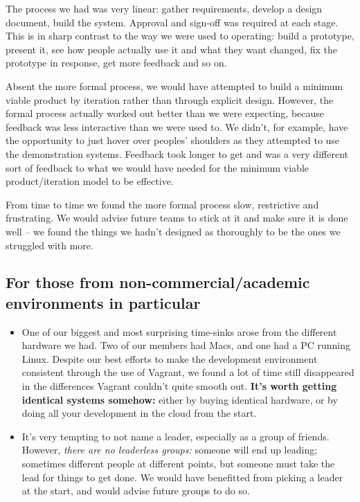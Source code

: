 \documentclass[12pt,a4paper,twosided]{article}
\begin{document}
The process we had was very linear: gather requirements, develop a
design document, build the system. Approval and sign-off was required at
each stage. This is in sharp contrast to the way we were used to
operating: build a prototype, present it, see how people actually use it
and what they want changed, fix the prototype in response, get more
feedback and so on.

Absent the more formal process, we would have attempted to build a
minimum viable product by iteration rather than through explicit design.
However, the formal process actually worked out better than we were
expecting, because feedback was less interactive than we were used to.
We didn't, for example, have the opportunity to just hover over peoples'
shoulders as they attempted to use the demonstration systems. Feedback
took longer to get and was a very different sort of feedback to what we
would have needed for the minimum viable product/iteration model to be
effective.

From time to time we found the more formal process slow, restrictive and
frustrating. We would advise future teams to stick at it and make sure
it is done well -- we found the things we hadn't designed as thoroughly
to be the ones we struggled with more.

\subsection{For those from non-commercial/academic environments in
particular}

\begin{itemize}
\item
  One of our biggest and most surprising time-sinks arose from the
  different hardware we had. Two of our members had Macs, and one had
  a PC running Linux. Despite our best efforts to
  make the development environment consistent through the use of
  Vagrant, we found a lot of time still disappeared in the differences
  Vagrant couldn't quite smooth out. \textbf{It's worth getting
  identical systems somehow:} either by buying identical hardware, or by
  doing all your development in the cloud from the start.
\item
  It's very tempting to not name a leader, especially as a group of
  friends. However, \emph{there are no leaderless groups:} someone will
  end up leading; sometimes different people at different points, but
  someone must take the lead for things to get done. We would have
  benefitted from picking a leader at the start, and would advise future
  groups to do so.
\end{itemize}
\end{document}
